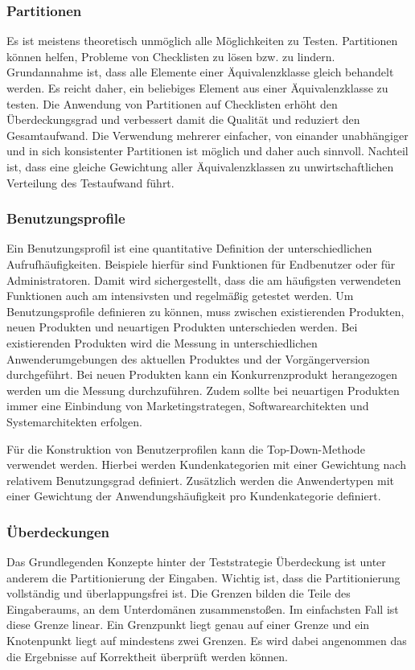 \subsubsection{Partitionen}
Es ist meistens theoretisch unmöglich alle Möglichkeiten zu Testen. Partitionen können helfen, Probleme von Checklisten zu lösen  bzw. zu lindern.
\linebreak
Grundannahme ist, dass alle Elemente einer Äquivalenzklasse gleich behandelt werden. Es reicht daher, ein beliebiges Element aus einer Äquivalenzklasse zu testen.
\linebreak
Die Anwendung von Partitionen auf Checklisten erhöht den Überdeckungsgrad und verbessert damit die Qualität und reduziert den Gesamtaufwand. 
\linebreak
Die Verwendung mehrerer einfacher, von einander unabhängiger und in sich konsistenter Partitionen ist möglich und daher auch sinnvoll.
Nachteil ist, dass eine gleiche Gewichtung aller Äquivalenzklassen zu unwirtschaftlichen Verteilung des Testaufwand führt.

\subsubsection{Benutzungsprofile}
Ein Benutzungsprofil ist eine quantitative Definition der unterschiedlichen Aufrufhäufigkeiten. Beispiele hierfür sind Funktionen für Endbenutzer oder für Administratoren. Damit wird sichergestellt, dass die am häufigsten verwendeten Funktionen auch am intensivsten und regelmäßig getestet werden. 
\linebreak
Um Benutzungsprofile definieren zu können, muss zwischen existierenden Produkten, neuen Produkten und neuartigen Produkten unterschieden werden. Bei existierenden Produkten wird die Messung in unterschiedlichen Anwenderumgebungen des aktuellen Produktes und der Vorgängerversion durchgeführt. Bei neuen Produkten kann ein Konkurrenzprodukt herangezogen werden um die Messung durchzuführen.
Zudem sollte bei neuartigen Produkten immer eine Einbindung von Marketingstrategen, Softwarearchitekten und Systemarchitekten erfolgen. 

Für die Konstruktion von Benutzerprofilen kann die Top-Down-Methode verwendet werden. Hierbei werden Kundenkategorien mit einer Gewichtung nach relativem Benutzungsgrad definiert. Zusätzlich werden die Anwendertypen mit einer Gewichtung der Anwendungshäufigkeit pro Kundenkategorie definiert.

\subsubsection{Überdeckungen}
Das Grundlegenden Konzepte hinter der Teststrategie Überdeckung ist unter anderem die Partitionierung der Eingaben. Wichtig ist, dass die Partitionierung vollständig und überlappungsfrei ist. Die Grenzen bilden die Teile des Eingaberaums, an dem Unterdomänen zusammenstoßen. Im einfachsten Fall ist diese Grenze linear.  Ein Grenzpunkt liegt genau auf einer Grenze und ein Knotenpunkt liegt auf mindestens zwei Grenzen. Es wird dabei angenommen das die Ergebnisse auf Korrektheit überprüft werden können.

